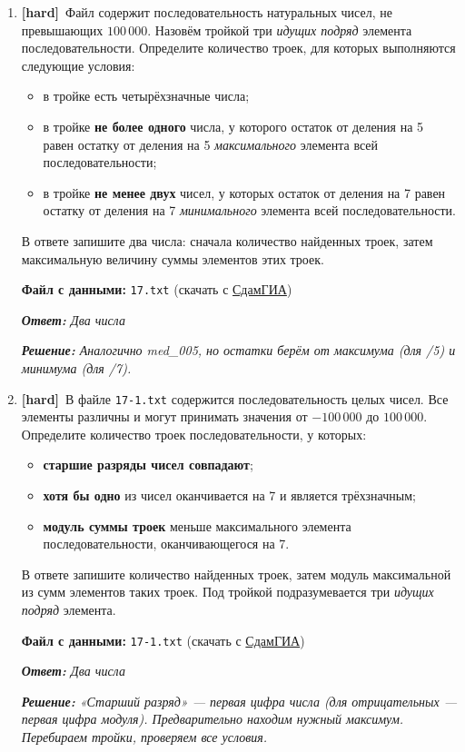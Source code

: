 \documentclass[a4paper]{article}
\newcommand{\hardtag}{\textcolor{hardcolor}{\textbf{[hard]}}}
\newcommand{\answer}[1]{\par\smallskip\textit{\textbf{Ответ:} #1}}
\newcommand{\solution}[1]{\par\textit{\textbf{Решение:} #1}}
\newcommand{\filehint}[1]{\par\smallskip\textbf{Файл с данными:} \texttt{#1} (скачать с \href{https://inf-ege.sdamgia.ru/}{СдамГИА})}
\begin{document}
\begin{enumerate}[label=\textbf{Задача \arabic*.}, leftmargin=*, itemsep=10mm]

  \item %
  \hardtag\ Файл содержит последовательность натуральных чисел, не превышающих $100\,000$.
  Назовём тройкой три \emph{идущих подряд} элемента последовательности.
  Определите количество троек, для которых выполняются следующие условия:
  \begin{itemize}
    \item в тройке есть четырёхзначные числа;
    \item в тройке \textbf{не более одного} числа, у которого остаток от деления
    на 5 равен остатку от деления на 5 \emph{максимального} элемента
    всей последовательности;
    \item в тройке \textbf{не менее двух} чисел, у которых остаток от деления на 7
    равен остатку от деления на 7 \emph{минимального} элемента всей
    последовательности.
  \end{itemize}
  В ответе запишите два числа: сначала количество найденных троек, затем
  максимальную величину суммы элементов этих троек.
  \filehint{17.txt}
  \answer{Два числа}
  \solution{Аналогично med\_005, но остатки берём от максимума (для /5) и минимума (для /7).}

  \bigskip

  \item %
  \hardtag\ В файле \texttt{17-1.txt} содержится последовательность целых чисел.
  Все элементы различны и могут принимать значения от $-100\,000$ до $100\,000$.
  Определите количество троек последовательности, у которых:
  \begin{itemize}
    \item \textbf{старшие разряды чисел совпадают};
    \item \textbf{хотя бы одно} из чисел оканчивается на 7 и является трёхзначным;
    \item \textbf{модуль суммы троек} меньше максимального элемента
    последовательности, оканчивающегося на 7.
  \end{itemize}
  В ответе запишите количество найденных троек, затем модуль максимальной из сумм
  элементов таких троек. Под тройкой подразумевается три \emph{идущих подряд}
  элемента.
  \filehint{17-1.txt}
  \answer{Два числа}
  \solution{«Старший разряд» — первая цифра числа (для отрицательных — первая цифра модуля). Предварительно находим нужный максимум. Перебираем тройки, проверяем все условия.}


\end{enumerate}
\end{document}
